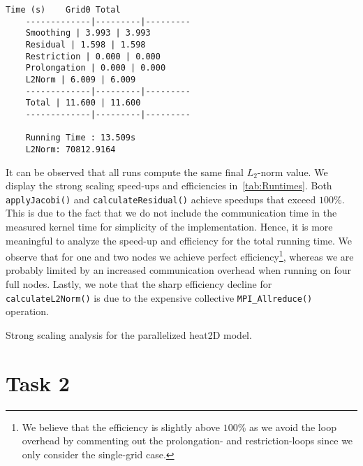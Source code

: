 \documentclass[11pt]{article}
\begin{document}
    \begin{lstlisting}[basicstyle=\scriptsize, caption={Output from running
    the parallelized model on two full nodes.}, float, floatplacement=h,
    frame=single, label={lst:FourNodes}]
    Time (s)    Grid0 Total
    -------------|---------|---------
    Smoothing | 3.993 | 3.993
    Residual | 1.598 | 1.598
    Restriction | 0.000 | 0.000
    Prolongation | 0.000 | 0.000
    L2Norm | 6.009 | 6.009
    -------------|---------|---------
    Total | 11.600 | 11.600
    -------------|---------|---------

    Running Time : 13.509s
    L2Norm: 70812.9164
    \end{lstlisting}

    It can be observed that all runs compute the same final $L_2$-norm value.
    We display the strong scaling speed-ups and efficiencies
    in~\cref{tab:Runtimes}.
    Both \lstinline{applyJacobi()} and \lstinline{calculateResidual()}
    achieve speedups that exceed $100$\%.
    This is due to the fact that we do not include the communication time in
    the measured kernel time for simplicity of the implementation.
    Hence, it is more meaningful to analyze the speed-up and efficiency for
    the total running time.
    We observe that for one and two nodes we achieve perfect
    efficiency\footnote{We believe that the efficiency is slightly above
    $100$\% as we avoid the loop overhead by commenting out the prolongation-
    and restriction-loops since we only consider the single-grid case.},
    whereas we are probably limited by an increased communication overhead
    when running on four full nodes.
    Lastly, we note that the sharp efficiency decline for
    \lstinline{calculateL2Norm()} is due to the expensive collective
    \lstinline{MPI_Allreduce()} operation.

    \begin{table}
        \caption{Strong scaling analysis for the parallelized heat2D model.}
        \label{tab:Runtimes}
        \vspace{.25cm}
        \begin{center}
            \resizebox{.5\textwidth}{!}{  }
        \end{center}
    \end{table}

    \section*{Task 2}
    \label{sec:Task2}
\end{document}
